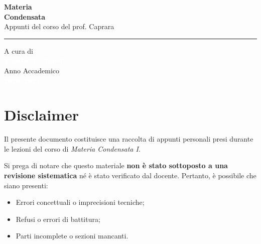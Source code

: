 \documentclass[12pt, a4paper, oneside]{book}
\begin{document}
\begin{titlepage}
\begin{flushleft}
        \vspace{4.5cm}
        
        \textcolor{colorE}{\sffamily\fontsize{60}{70}\selectfont\textbf{Materia}}\\[0.1cm]
        \textcolor{colorE}{\sffamily\fontsize{60}{70}\selectfont\textbf{Condensata}}\\[0.6cm]
        \textcolor{white!80}{\sffamily\Large Appunti del corso del prof. Caprara}\\[0.5cm]
        \textcolor{white!30}{\rule{6cm}{1pt}} %
    \end{flushleft}
    
    \vfill %
    
    \begin{flushleft}
        \textcolor{white!60}{\sffamily\large A cura di}\\[0.2cm]
        \textcolor{white}{\sffamily\huge\textbf{Elisabetta Agnello}}\\[1.2cm]
        
        \textcolor{white!60}{\sffamily\large Anno Accademico}\\[0.2cm]
        \textcolor{white}{\sffamily\Large\textbf{2020/2021}}
    \end{flushleft}
    
    \vspace*{1cm} %
\end{titlepage}
    

\frontmatter 
\chapter*{Disclaimer}
\thispagestyle{empty} %

Il presente documento costituisce una raccolta di appunti personali presi durante le lezioni del corso di \textit{Materia Condensata I}. 

Si prega di notare che questo materiale \textbf{non è stato sottoposto a una revisione sistematica} né è stato verificato dal docente. Pertanto, è possibile che siano presenti:
\begin{itemize}
    \item Errori concettuali o imprecisioni tecniche;
    \item Refusi o errori di battitura;
    \item Parti incomplete o sezioni mancanti.
\end{itemize}
\end{document}
